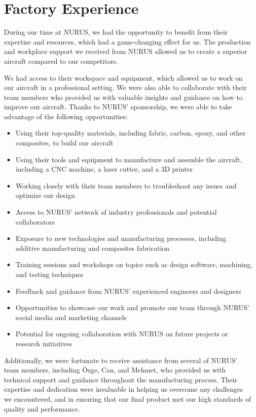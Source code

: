 \documentclass{article}
\begin{document}
\section{Factory Experience}

During our time at NURUS, we had the opportunity to benefit from their expertise and resources, which had a game-changing effect for us. The production and workplace support we received from NURUS allowed us to create a superior aircraft compared to our competitors.

We had access to their workspace and equipment, which allowed us to work on our aircraft in a professional setting. We were also able to collaborate with their team members who provided us with valuable insights and guidance on how to improve our aircraft. Thanks to NURUS' sponsorship, we were able to take advantage of the following opportunities:

\begin{itemize}
\item Using their top-quality materials, including fabric, carbon, epoxy, and other composites, to build our aircraft
\item Using their tools and equipment to manufacture and assemble the aircraft, including a CNC machine, a laser cutter, and a 3D printer
\item Working closely with their team members to troubleshoot any issues and optimize our design
\item Access to NURUS' network of industry professionals and potential collaborators
\item Exposure to new technologies and manufacturing processes, including additive manufacturing and composites fabrication
\item Training sessions and workshops on topics such as design software, machining, and testing techniques
\item Feedback and guidance from NURUS' experienced engineers and designers
\item Opportunities to showcase our work and promote our team through NURUS' social media and marketing channels
\item Potential for ongoing collaboration with NURUS on future projects or research initiatives
\end{itemize}

Additionally, we were fortunate to receive assistance from several of NURUS' team members, including Özge, Can, and Mehmet, who provided us with technical support and guidance throughout the manufacturing process. Their expertise and dedication were invaluable in helping us overcome any challenges we encountered, and in ensuring that our final product met our high standards of quality and performance.
\end{document}
